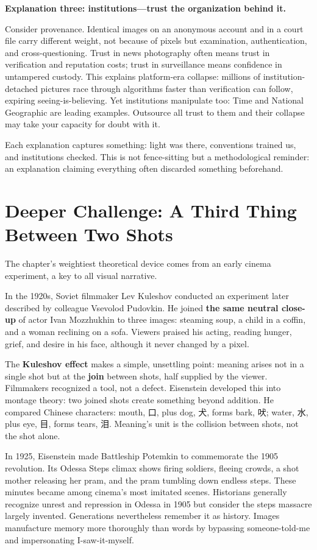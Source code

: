 \textbf{Explanation three: institutions---trust the organization behind it.}

Consider provenance. Identical images on an anonymous account and in a court file carry different weight, not because of pixels but examination, authentication, and cross-questioning. Trust in news photography often means trust in verification and reputation costs; trust in surveillance means confidence in untampered custody. This explains platform-era collapse: millions of institution-detached pictures race through algorithms faster than verification can follow, expiring seeing-is-believing. Yet institutions manipulate too: Time and National Geographic are leading examples. Outsource all trust to them and their collapse may take your capacity for doubt with it.

Each explanation captures something: light was there, conventions trained us, and institutions checked. This is not fence-sitting but a methodological reminder: an explanation claiming everything often discarded something beforehand.

\section[A Third Thing Between Two Shots]{Deeper Challenge: A Third Thing Between Two Shots}
The chapter's weightiest theoretical device comes from an early cinema experiment, a key to all visual narrative.

In the 1920s, Soviet filmmaker Lev Kuleshov conducted an experiment later described by colleague Vsevolod Pudovkin. He joined \textbf{the same neutral close-up} of actor Ivan Mozzhukhin to three images: steaming soup, a child in a coffin, and a woman reclining on a sofa. Viewers praised his acting, reading hunger, grief, and desire in his face, although it never changed by a pixel.

The \textbf{Kuleshov effect} makes a simple, unsettling point: meaning arises not in a single shot but at the \textbf{join} between shots, half supplied by the viewer. Filmmakers recognized a tool, not a defect. Eisenstein developed this into montage theory: two joined shots create something beyond addition. He compared Chinese characters: mouth, \mbox{口}, plus dog, \mbox{犬}, forms bark, \mbox{吠}; water, \mbox{水}, plus eye, \mbox{目}, forms tears, \mbox{泪}. Meaning's unit is the collision between shots, not the shot alone.

In 1925, Eisenstein made Battleship Potemkin to commemorate the 1905 revolution. Its Odessa Steps climax shows firing soldiers, fleeing crowds, a shot mother releasing her pram, and the pram tumbling down endless steps. These minutes became among cinema's most imitated scenes. Historians generally recognize unrest and repression in Odessa in 1905 but consider the steps massacre largely invented. Generations nevertheless remember it as history. Images manufacture memory more thoroughly than words by bypassing someone-told-me and impersonating I-saw-it-myself.

